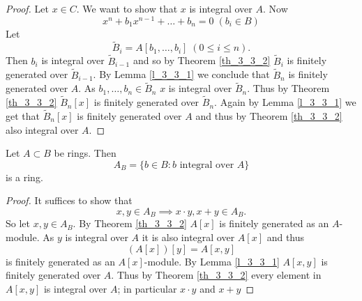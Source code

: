 \documentclass[NumTh.tex]{subfiles}
\begin{document}
\begin{proof}
  Let $x \in C$.
  We want to show that $x$ is integral over $A$.
  Now 
  \[ x^n + b_1 x^{n-1} + \dots + b_n = 0 \; (b_i \in B) \]
  Let 
  \[ \tilde{B}_i = A[b_1,\dots,b_i] \; (0 \leq i \leq n) \text{.} \]
  Then $b_i$ is integral over $\tilde{B}_{i-1}$ and so by Theorem \ref{th_3_3_2} $\tilde{B}_i$ is finitely generated over $\tilde{B}_{i-1}$.
  By Lemma \ref{l_3_3_1} we conclude that $\tilde{B}_n$ is finitely generated over $A$.
  As $b_1,\dots,b_n \in \tilde{B}_n$ $x$ is integral over $\tilde{B}_n$.
  Thus by Theorem \ref{th_3_3_2} $\tilde{B}_n[x]$ is finitely generated over $\tilde{B}_n$.
  Again by Lemma \ref{l_3_3_1} we get that $\tilde{B}_n[x]$ is finitely generated over $A$ and thus by Theorem \ref{th_3_3_2} also integral over $A$.
\end{proof}

\begin{cor}\label{cor_3_3_4}
  Let $A \subset B$ be rings. Then 
  \[ A_B = \{ b \in B : b \text{ integral over } A \} \]
  is a ring.
\end{cor}

\begin{proof}
  It suffices to show that 
  \[ x,y\in A_B \implies x \cdot y , x+y \in  A_B \text{.} \]
  So let $x,y \in A_B$.
  By Theorem \ref{th_3_3_2} $A[x]$ is finitely generated as an $A$-module.
  As $y$ is integral over $A$ it is also integral over $A[x]$ and thus 
  \[ (A[x])[y] = A[x,y] \] 
  is finitely generated as an $A[x]$-module.
  By Lemma \ref{l_3_3_1} $A[x,y]$ is finitely generated over $A$.
  Thus by Theorem \ref{th_3_3_2} every element in $A[x,y]$ is integral over $A$; in particular $x \cdot y$ and $x+y$
\end{proof}
\end{document}
